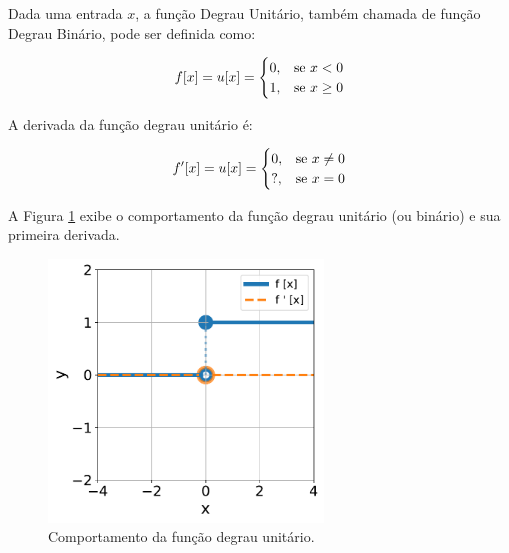 \linebreak
\newpage


\begin{definition}
    Dada uma entrada $x$, a função Degrau Unitário, também chamada de função Degrau Binário, pode ser definida como:

    \begin{equation}
        f[x] = u[x] = 
        \begin{cases}
            0, & \text{se $x < 0$}\\
            1, & \text{se $x \geq 0$}
        \end{cases}
        \vspace{0.2cm}
        \label{eq:ann_step_function}
    \end{equation}

    A derivada da função degrau unitário é:

    \begin{equation}
        f'[x] = u[x] = 
        \begin{cases}
            0, & \text{se $x \neq 0$}\\
            \text{?}, & \text{se $x = 0$}
        \end{cases}
        \vspace{0.2cm}
        \label{eq:ann_step_function_dy}
    \end{equation}
    
\end{definition}

A Figura \ref{fig:ann_step_function} exibe o comportamento da função degrau unitário (ou binário) e sua primeira derivada.

\begin{figure}[H]
    \centering
    \includegraphics[width=0.65\textwidth]{figs/ann_unit_step_function.pdf}
    \caption{Comportamento da função degrau unitário.}
    \label{fig:ann_step_function}
\end{figure}


